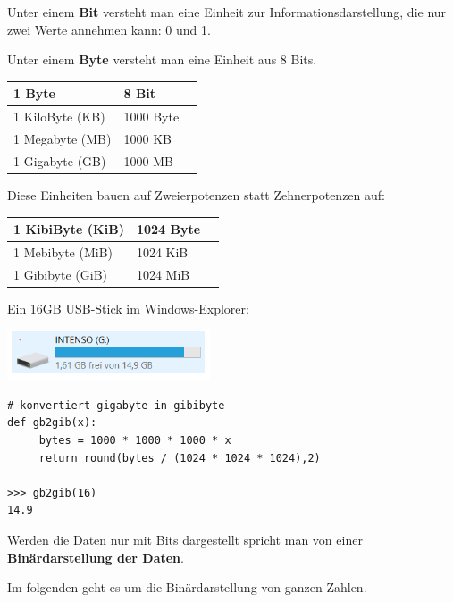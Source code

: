 \documentclass[10pt]{beamer}
\begin{document}
\begin{frame}[fragile]
Unter einem \textbf{Bit} versteht man eine Einheit zur Informationsdarstellung, die nur zwei Werte annehmen kann: 0 und 1.

Unter einem \textbf{Byte} versteht man eine Einheit aus 8 Bits.  

\begin{tabular}{|l|l|c|}
\hline 1 Byte & 8 Bit  \\
\hline 1 KiloByte (KB) & 1000 Byte \\
\hline 1 Megabyte (MB) & 1000 KB \\
\hline 1 Gigabyte (GB) & 1000 MB \\
\hline 
\end{tabular} \pause

Diese Einheiten bauen auf Zweierpotenzen statt Zehnerpotenzen auf:

\begin{tabular}{|l|l|c|}
\hline 1 KibiByte (KiB) & 1024 Byte \\
\hline 1 Mebibyte (MiB) & 1024 KiB \\
\hline 1 Gibibyte (GiB) & 1024 MiB \\
\hline 
\end{tabular}
\end{frame}

\begin{frame}[fragile]
Ein 16GB USB-Stick im Windows-Explorer:

\includegraphics[width=6cm]{bild3.png} \pause

\begin{lstlisting}
# konvertiert gigabyte in gibibyte
def gb2gib(x):
     bytes = 1000 * 1000 * 1000 * x
     return round(bytes / (1024 * 1024 * 1024),2) 
     
>>> gb2gib(16)
14.9
\end{lstlisting} 

Werden die Daten nur mit Bits dargestellt spricht man von
einer \textbf{Binärdarstellung der Daten}. 

Im folgenden geht es um die Binärdarstellung von ganzen Zahlen.
\end{frame}
\end{document}
